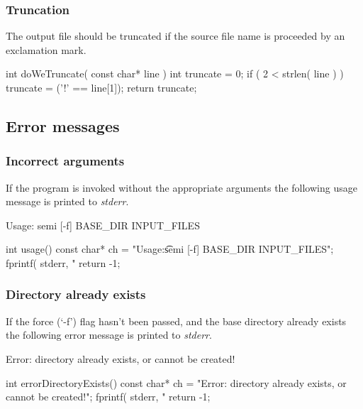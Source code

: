 \documentclass[]{article}
\begin{document}
\subsubsection{			Truncation}

The output file should be truncated if the source file name is proceeded by an exclamation mark.

\begin{verbatimtab}
int doWeTruncate( const char* line )
{
	int truncate = 0;
	if ( 2 < strlen( line ) )
	{
		truncate = ('!' == line[1]);
	}
	return truncate;
}

\end{verbatimtab}
\subsection{		Error messages}
\subsubsection{			Incorrect arguments}

If the program is invoked without the appropriate arguments the following usage message is printed to \emph{stderr}.

\begin{verbatimtab}
Usage:
	semi [-f] BASE_DIR INPUT_FILES

\end{verbatimtab}
\begin{verbatimtab}
int usage()
{
	const char* ch = "Usage:\n\t semi [-f] BASE_DIR INPUT_FILES";
	fprintf( stderr, "%
	return -1;
}

\end{verbatimtab}
\subsubsection{			Directory already exists}

If the force (`-f') flag hasn't been passed, and the base directory already exists the following error message is printed to \emph{stderr}.

\begin{verbatimtab}
	Error: directory already exists, or cannot be created!

\end{verbatimtab}
\begin{verbatimtab}
int errorDirectoryExists()
{
	const char* ch = "Error: directory already exists, or cannot be created!";
	fprintf( stderr, "%
	return -1;
}

\end{verbatimtab}
\end{document}
